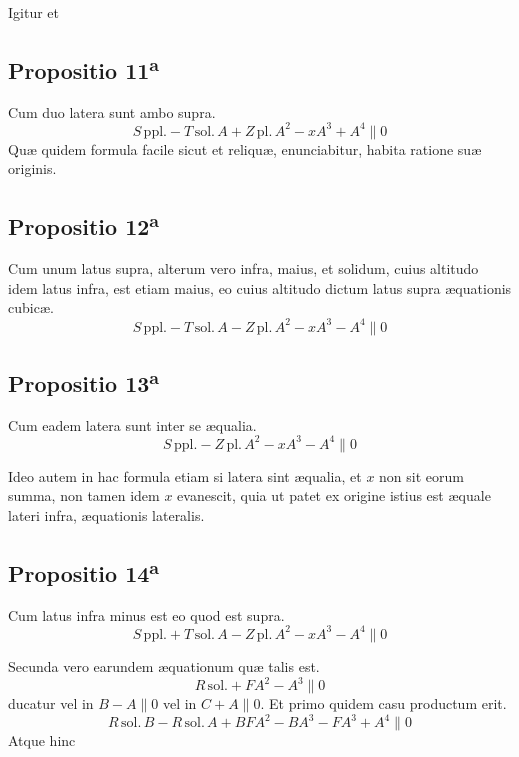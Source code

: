 \documentclass[11pt,a4paper]{article}
\begin{document}
Igitur et

\subsection*{Propositio 11\textsuperscript{a}}

Cum duo latera sunt ambo supra.
\[ S\,\mathrm{ppl.} - T\,\mathrm{sol.}\,A + Z\,\mathrm{pl.}\,A^2 - x A^3 + A^4 \parallel 0 \]
Quæ quidem formula facile sicut et reliquæ, enunciabitur, habita ratione suæ originis.

\subsection*{Propositio 12\textsuperscript{a}}

Cum unum latus supra, alterum vero infra, maius, et solidum, cuius altitudo idem latus infra, est etiam maius, eo cuius altitudo dictum latus supra æquationis cubicæ.
\[ S\,\mathrm{ppl.} - T\,\mathrm{sol.}\,A - Z\,\mathrm{pl.}\,A^2 - x A^3 - A^4 \parallel 0 \]

\subsection*{Propositio 13\textsuperscript{a}}

Cum eadem latera sunt inter se æqualia.
\[ S\,\mathrm{ppl.} - Z\,\mathrm{pl.}\,A^2 - x A^3 - A^4 \parallel 0 \]

Ideo autem in hac formula etiam si latera sint æqualia, et $x$ non sit eorum summa, non tamen idem $x$ evanescit, quia ut patet ex origine istius est æquale lateri infra, æquationis lateralis.

\subsection*{Propositio 14\textsuperscript{a}}

Cum latus infra minus est eo quod est supra.
\[ S\,\mathrm{ppl.} + T\,\mathrm{sol.}\,A - Z\,\mathrm{pl.}\,A^2 - x A^3 - A^4 \parallel 0 \]

Secunda vero earundem æquationum quæ talis est.
\[ R\,\mathrm{sol.} + F A^2 - A^3 \parallel 0 \]
ducatur vel in $B - A \parallel 0$ vel in $C + A \parallel 0$. Et primo quidem casu productum erit.
\[ R\,\mathrm{sol.}\,B - R\,\mathrm{sol.}\,A + B F A^2 - B A^3 - F A^3 + A^4 \parallel 0 \]
Atque hinc
\end{document}

